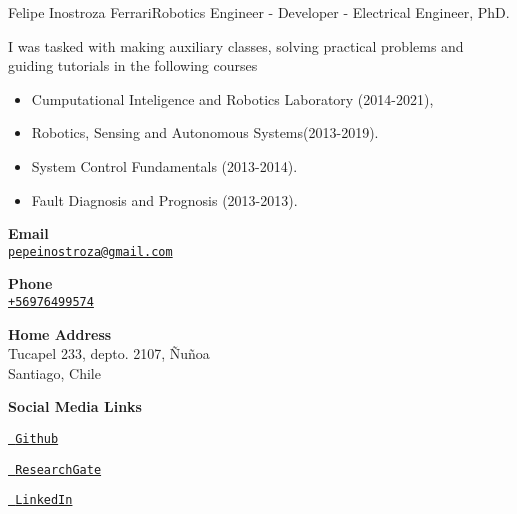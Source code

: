 \documentclass{article}
\begin{document}
\begin{cv}[avatar]{Felipe Inostroza Ferrari}{Robotics Engineer - Developer - Electrical Engineer, PhD.}
	\begin{cvevent}[2014][2021]
		I was tasked with making auxiliary classes, solving practical problems and guiding tutorials in the following courses
		\begin{itemize}
			\item Cumputational Inteligence and Robotics Laboratory (2014-2021),
			\item Robotics, Sensing and Autonomous Systems(2013-2019).
			\item System Control Fundamentals (2013-2014).
			\item Fault Diagnosis and Prognosis (2013-2013).
		\end{itemize}
	\end{cvevent}




	



	\cvsidebar %



	\begin{cvitem}[Envelope][4]
		\textbf{Email}\\
		\href{mailto:pepeinostroza@gmail.com}{\texttt{pepeinostroza@gmail.com}}
	\end{cvitem}

	\cvseparator[3]
	\begin{cvitem}[Phone][4]
		\textbf{Phone}\\
		\href{tel:+56976499574}{\texttt{+56976499574}}
	\end{cvitem}

	\cvseparator[3]
	\begin{cvitem}[Home][4]
		\textbf{Home Address}\\
		Tucapel 233, depto. 2107, Ñuñoa\\ Santiago, Chile
	\end{cvitem}

	\cvseparator[3]
	\textbf{Social Media Links}\\
	\begin{cvitem}[][4]
		\href{https://https://github.com/finostro}{\faGithub \texttt{ Github}}
	\end{cvitem}
	\begin{cvitem}[][4]
		\href{https://www.researchgate.net/profile/Felipe-Inostroza-4}{\faResearchgate \texttt{ ResearchGate}}
	\end{cvitem}
	\begin{cvitem}[][4]
		\href{https://www.linkedin.com/in/felipe-inostroza-ferrari-a0852035/}{\faLinkedin \texttt{ LinkedIn}}
	\end{cvitem}


\end{cv}
\end{document}
